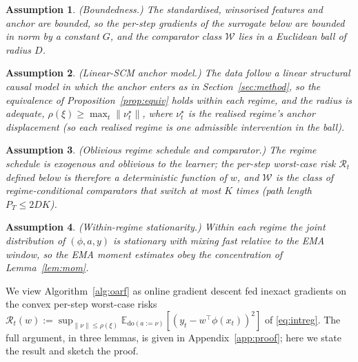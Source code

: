 \documentclass[authoryear,preprint,12pt]{elsarticle}
\theoremstyle{plain}
\newtheorem{assumption}{Assumption}
\theoremstyle{remark}
\newcommand{\E}{\mathbb{E}}
\newcommand{\doop}{\mathrm{do}}
\begin{document}
\begin{assumption}\label{ass:bounded} (Boundedness.) The standardised, winsorised
features and anchor are bounded, so the per-step gradients of the surrogate below are
bounded in norm by a constant $G$, and the comparator class $\mathcal{W}$ lies in a
Euclidean ball of radius $D$.
\end{assumption}
\begin{assumption}\label{ass:scm} (Linear-SCM anchor model.) The data follow a linear
structural causal model in which the anchor enters as in Section~\ref{sec:method},
so the equivalence of Proposition~\ref{prop:equiv} holds within each regime, and the
radius is adequate, $\rho(\xi)\ge\max_t\|\nu_t^\star\|$, where $\nu_t^\star$ is the
realised regime's anchor displacement (so each realised regime is one admissible
intervention in the ball).
\end{assumption}
\begin{assumption}\label{ass:comp} (Oblivious regime schedule and comparator.) The
regime schedule is exogenous and oblivious to the learner; the per-step worst-case
risk $\mathcal{R}_t$ defined below is therefore a deterministic function of $w$, and
$\mathcal{W}$ is the class of regime-conditional comparators that switch at most $K$
times (path length $P_T\le 2DK$).
\end{assumption}
\begin{assumption}\label{ass:moment} (Within-regime stationarity.) Within each regime
the joint distribution of $(\phi,a,y)$ is stationary with mixing fast relative to the
EMA window, so the EMA moment estimates obey the concentration of Lemma~\ref{lem:mom}.
\end{assumption}

We view Algorithm~\ref{alg:oarf} as online gradient descent fed inexact gradients on
the convex per-step worst-case risks
$\mathcal{R}_t(w):=\sup_{\|\nu\|\le\rho(\xi)}\E_{\doop(a:=\nu)}[(y_t-w^\top\phi(x_t))^2]$
of \eqref{eq:intreg}. The full argument, in three lemmas, is given in
Appendix~\ref{app:proof}; here we state the result and sketch the proof.
\end{document}
